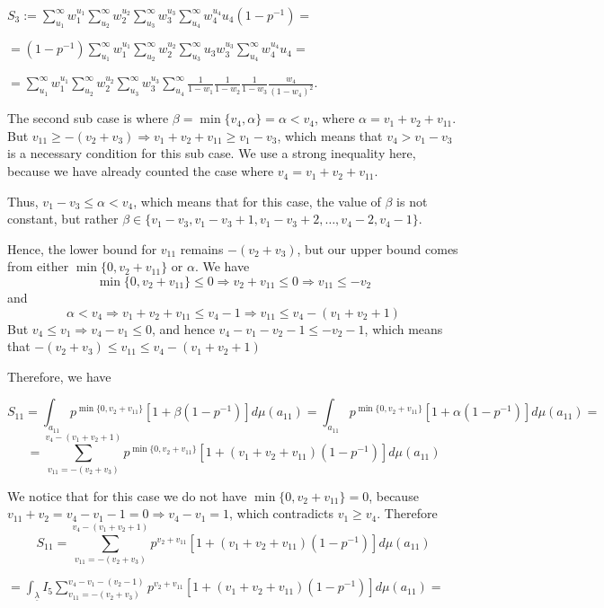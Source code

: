 \documentclass{article}
\begin{document}
$S_{3}:=\sum_{u_{1}}^{\infty}w_{1}^{u_{1}}\sum_{u_{2}}^{\infty}w_{2}^{u_{2}}\sum_{u_{3}}^{\infty}w_{3}^{u_{3}}\sum_{u_{4}}^{\infty}w_{4}^{u_{4}}u_{4}(1-p^{-1})=$

$=(1-p^{-1})\sum_{u_{1}}^{\infty}w_{1}^{u_{1}}\sum_{u_{2}}^{\infty}w_{2}^{u_{2}}\sum_{u_{3}}^{\infty}u_{3}w_{3}^{u_{3}}\sum_{u_{4}}^{\infty}w_{4}^{u_{4}}u_{4}=$

$=\sum_{u_{1}}^{\infty}w_{1}^{u_{1}}\sum_{u_{2}}^{\infty}w_{2}^{u_{2}}\sum_{u_{3}}^{\infty}w_{3}^{u_{3}}\sum_{u_{4}}^{\infty}\frac{1}{1-w_{1}}\frac{1}{1-w_{2}}\frac{1}{1-w_{3}}\frac{w_{4}}{(1-w_{4})^{2}}$.

The second sub case is where $\beta=\min\{v_4,\alpha\}=\alpha<v_{4}$, where $\alpha=v_1+v_2+v_{11}$. 
But $v_{11}\geq{-(v_2+v_3)}\Rightarrow{v_1+v_2+v_{11}\geq{v_1-v_3}}$, which means that ${v_{4}>v_1-v_3}$ is a necessary condition for this sub case. We use a strong inequality here, because we have already counted the case where $v_4=v_1+v_2+v_{11}$.

Thus, $v_1-v_3\leq\alpha<v_4$, which means that for this case, the value of $\beta$ is not constant, but rather $\beta\in\{v_1-v_3,v_1-v_3+1,v_1-v_3+2,\dots,v_4-2,v_4-1\}$.

Hence, the lower bound for $v_{11}$ remains $-(v_2+v_3)$, but our upper bound comes from either $\min\{0,v_2+v_{11}\}$ or $\alpha$. We have \[\min\{0,v_2+v_{11}\}\leq{0}\Rightarrow{v_2+v_{11}\leq{0}}\Rightarrow{v_{11}\leq{-v_2}}\] 
and \[\alpha<v_4\Rightarrow{v_1+v_2+v_{11}\leq{v_4-1}}\Rightarrow{v_{11}\leq{v_4-(v_1+v_2+1)}}\]
But $v_4\leq{v_1}\Rightarrow{v_4-v_1\leq{0}}$, and hence $v_4-v_1-v_2-1\leq{-v_2-1}$, which means that $-(v_2+v_3)\leq{v_{11}}\leq{v_4-(v_1+v_2+1)}$

Therefore, we have

\[S_{11}=\displaystyle\int_{a_{11}}p^{\min\{0,v_{2}+v_{11}\}}[1+\beta(1-p^{-1})]d\mu(a_{11})=\displaystyle\int_{a_{11}}p^{\min\{0,v_{2}+v_{11}\}}[1+\alpha(1-p^{-1})]d\mu(a_{11})=\]
\[=\sum_{v_{11}=-(v_2+v_3)}^{v_{4}-(v_1+v_2+1)}p^{\min\{0,v_2+v_{11}\}}[1+(v_1+v_2+v_{11})(1-p^{-1})]d\mu(a_{11})\]

We notice that for this case we do not have $\min\{0,v_2+v_11\}=0$, because $v_{11}+v_2=v_4-v_1-1=0\Rightarrow{v_4-v_1=1}$, which contradicts $v_1\geq{v_4}$. Therefore 
\[S_{11}=\sum_{v_{11}=-(v_2+v_3)}^{v_{4}-(v_1+v_2+1)}p^{v_2+v_{11}}[1+(v_1+v_2+v_{11})(1-p^{-1})]d\mu(a_{11})\]

$=\displaystyle\int_{\underline\lambda}I_{5}\sum_{v_{11}=-(v_2+v_3)}^{v_{4}-v_1-(v_2-1)}p^{v_{2}+v_{11}}[1+(v_1+v_2+v_{11})(1-p^{-1})]d\mu(a_{11})=$
\end{document}

